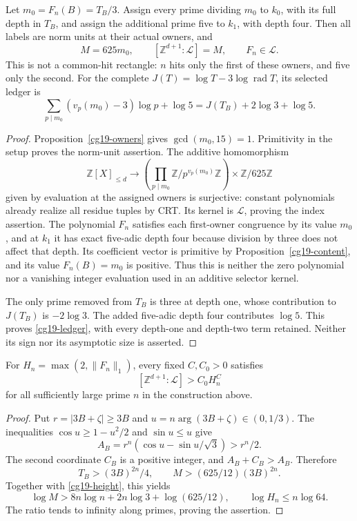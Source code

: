 \begin{theorem}
\label{cg19-index}
Let \(m_0=F_n(B)=T_B/3\). Assign every prime dividing \(m_0\) to
\(k_0\), with its full depth in \(T_B\), and assign the additional
prime five to \(k_1\), with depth four. Then all labels are norm
units at their actual owners, and
\begin{equation}
 M=625m_0,\qquad [\mathbb Z^{d+1}:\mathcal L]=M,\qquad
 F_n\in\mathcal L.
 \label{cg19-index-eq}
\end{equation}
This is not a common-hit rectangle: \(n\) hits only the first of
these owners, and five only the second. For the complete
\(J(T)=\log T-3\log\operatorname{rad}T\), its selected ledger is
\begin{equation}
 \sum_{p\mid m_0}(v_p(m_0)-3)\log p+\log5
 =J(T_B)+2\log3+\log5.
 \label{cg19-ledger}
\end{equation}
\end{theorem}
\begin{proof}
Proposition~\ref{cg19-owners} gives \(\gcd(m_0,15)=1\).
Primitivity in the setup proves the norm-unit assertion.
The additive homomorphism
\[
 \mathbb Z[X]_{\le d}\longrightarrow
 \left(\prod_{p\mid m_0}\mathbb Z/p^{v_p(m_0)}\mathbb Z\right)
 \times\mathbb Z/625\mathbb Z
\]
given by evaluation at the assigned owners is surjective:
constant polynomials already realize all residue tuples by CRT.
Its kernel is \(\mathcal L\), proving the index assertion.
The polynomial \(F_n\) satisfies each first-owner congruence by
its value \(m_0\), and at \(k_1\) it has exact five-adic depth
four because division by three does not affect that depth.
Its coefficient vector is primitive by
Proposition~\ref{cg19-content}, and its value \(F_n(B)=m_0\)
is positive. Thus this is neither the zero polynomial nor a
vanishing integer evaluation used in an additive selector kernel.

The only prime removed from \(T_B\) is three at depth one, whose
contribution to \(J(T_B)\) is \(-2\log3\). The added five-adic
depth four contributes \(\log5\). This proves
\eqref{cg19-ledger}, with every depth-one and depth-two term
retained. Neither its sign nor its asymptotic size is asserted.
\end{proof}

\begin{theorem}
\label{cg19-obstruction}
For \(H_n=\max(2,\|F_n\|_1)\), every fixed \(C,C_0>0\) satisfies
\[
 [\mathbb Z^{d+1}:\mathcal L]>C_0H_n^C
\]
for all sufficiently large prime \(n\) in the construction above.
\end{theorem}
\begin{proof}
Put \(r=|3B+\zeta|\ge3B\) and \(u=n\arg(3B+\zeta)\in(0,1/3)\).
The inequalities \(\cos u\ge1-u^2/2\) and \(\sin u\le u\)
give
\[
 A_B=r^n(\cos u-\sin u/\sqrt3)>r^n/2.
\]
The second coordinate \(C_B\) is a positive integer, and
\(A_B+C_B>A_B\). Therefore
\[
 T_B>(3B)^{2n}/4,\qquad M>(625/12)(3B)^{2n}.
\]
Together with \eqref{cg19-height}, this yields
\[
 \log M>8n\log n+2n\log3+\log(625/12),\qquad
 \log H_n\le n\log64.
\]
The ratio tends to infinity along primes, proving the assertion.
\end{proof}

